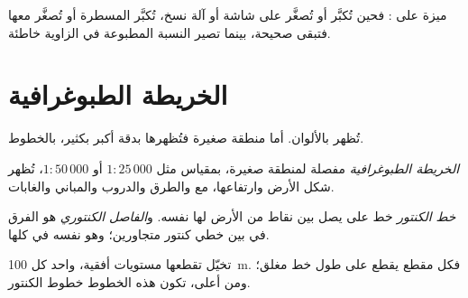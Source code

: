  ميزة على : فحين تُكبَّر  أو تُصغَّر
على شاشة أو آلة نسخ، تُكبَّر المسطرة أو تُصغَّر معها فتبقى صحيحة، بينما
تصير النسبة المطبوعة في الزاوية
خاطئة.

\section{الخريطة الطبوغرافية}

تُظهر   بالألوان. أما  منطقة صغيرة فتُظهرها
بدقة أكبر بكثير، بالخطوط.

\begin{definition}\label{def:g9:maps-of-the-earth:topographic-map}
\emph{الخريطة الطبوغرافية}  مفصلة لمنطقة
صغيرة، بمقياس مثل $1 : 25\,000$ أو $1 : 50\,000$، تُظهر شكل الأرض
وارتفاعها، مع  والطرق والدروب والمباني
والغابات.
\end{definition}

\begin{definition}\label{def:g9:maps-of-the-earth:contour}
\emph{خط الكنتور} خط على  يصل بين نقاط من الأرض
لها  نفسه. و\emph{الفاصل الكنتوري} هو الفرق في
 بين خطي كنتور متجاورين؛ وهو نفسه في 
كلها.
\end{definition}

تخيّل  تقطعها مستويات أفقية، واحد كل \qty{100}{m}. فكل مقطع يقطع
 على طول خط مغلق؛ ومن أعلى، تكون هذه الخطوط خطوط
الكنتور.

